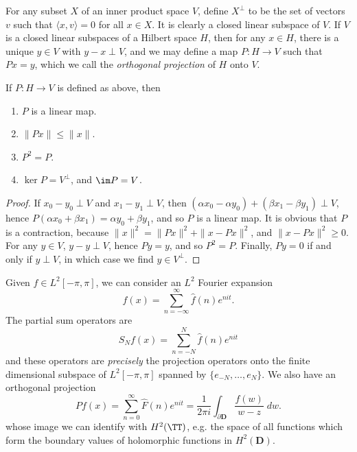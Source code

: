 For any subset $X$ of an inner product space $V$, define $X^\perp$ to be the set of vectors $v$ such that $\langle x, v \rangle = 0$ for all $x \in X$. It is clearly a closed linear subspace of $V$. If $V$ is a closed linear subspaces of a Hilbert space $H$, then for any $x \in H$, there is a unique $y \in V$ with $y - x \perp V$, and we may define a map $P: H \to V$ such that $Px = y$, which we call the \emph{orthogonal projection} of $H$ onto $V$.

\begin{theorem}
    If $P: H \to V$ is defined as above, then
    \begin{enumerate}
        \item $P$ is a linear map.
        \item $\| Px \| \leq \| x \|$.
        \item $P^2 = P$.
        \item $\ker P = V^\perp$, and $\im P = V$.
    \end{enumerate}
\end{theorem}
\begin{proof}
    If $x_0 - y_0 \perp V$ and $x_1 - y_1 \perp V$, then $(\alpha x_0 - \alpha y_0) + (\beta x_1 - \beta y_1) \perp V$, hence $P(\alpha x_0 + \beta x_1) = \alpha y_0 + \beta y_1$, and so $P$ is a linear map. It is obvious that $P$ is a contraction, because $\| x \|^2 = \| Px \|^2 + \| x - Px \|^2$, and $\| x - Px \|^2 \geq 0$. For any $y \in V$, $y - y \perp V$, hence $Py = y$, and so $P^2 = P$. Finally, $Py = 0$ if and only if $y \perp V$, in which case we find $y \in V^\perp$.
\end{proof}

\begin{example}
    Given $f \in L^2[-\pi,\pi]$, we can consider an $L^2$ Fourier expansion
    \[ f(x) = \sum_{n = -\infty}^\infty \widehat{f}(n) e^{nit}. \]
    The partial sum operators are
    \[ S_N f(x) = \sum_{n = -N}^N \widehat{f}(n) e^{nit} \]
    and these operators are \emph{precisely} the projection operators onto the finite dimensional subspace of $L^2[-\pi,\pi]$ spanned by $\{ e_{-N}, \dots, e_N \}$. We also have an orthogonal projection
    \[ Pf(x) = \sum_{n = 0}^\infty \widehat{F}(n) e^{nit} = \frac{1}{2 \pi i} \int_{\partial \mathbf{D}} \frac{f(w)}{w - z}\; dw. \]
    whose image we can identify with $H^2(\TT)$, e.g. the space of all functions which form the boundary values of holomorphic functions in $H^2(\mathbf{D})$.
\end{example}

